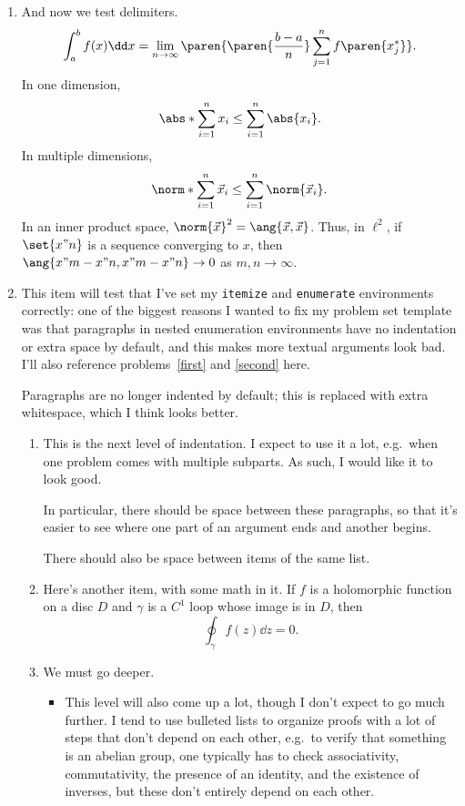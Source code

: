 \documentclass[onesided]{../../ccg-pset}
\begin{document}
\begin{enumerate}
\item And now we test delimiters. \label{second}
\[\int_a^b f(x)\dd x = \lim_{n\to\infty}\paren{\paren{\frac{b-a}{n}}\sum_{j=1}^n f\paren{x_j^*}}.\]
In one dimension,
\begin{equation}
\abs*{\sum_{i=1}^n x_i} \le \sum_{i=1}^n \abs{x_i}.
\end{equation}
In multiple dimensions,
\begin{equation}
\norm*{\sum_{i=1}^n \vec x_i} \le \sum_{i=1}^n\norm{\vec x_i}.
\end{equation}
In an inner product space, \(\norm{\vec x}^2 = \ang{\vec x,\vec x}\). Thus, in \(\ell^2\), if \(\set{x"n}\) is a
sequence converging to \(x\), then \(\ang{x"m-x"n,x"m-x"n}\to 0\) as \(m,n\to\infty\).
\item This item will test that I've set my \verb+itemize+ and \verb+enumerate+ environments correctly: one of the
biggest reasons I wanted to fix my problem set template was that paragraphs in nested enumeration environments
have no indentation or extra space by default, and this makes more textual arguments look bad. I'll also reference
problems~\ref{first} and \ref{second} here.

Paragraphs are no longer indented by default; this is replaced with extra whitespace, which I think looks better.
\begin{enumerate}
	\item This is the next level of indentation. I expect to use it a lot, e.g.\ when one problem comes with
	multiple subparts. As such, I would like it to look good.

	In particular, there should be space between these paragraphs, so that it's easier to see where one part of an
	argument ends and another begins.

	There should also be space between items of the same list.
	\item Here's another item, with some math in it. If \(f\) is a holomorphic function on a disc \(D\) and
	\(\gamma\) is a \(C^1\) loop whose image is in \(D\), then
	\[\oint_\gamma f(z)\dd z = 0.\]
	\item We must go deeper.
	\begin{itemize}
		\item This level will also come up a lot, though I don't expect to go much further. I tend to use bulleted
		lists to organize proofs with a lot of steps that don't depend on each other, e.g.\ to verify that
		something is an abelian group, one typically has to check associativity, commutativity, the presence of an
		identity, and the existence of inverses, but these don't entirely depend on each other.


\end{itemize}
\end{enumerate}
\end{enumerate}
\end{document}
